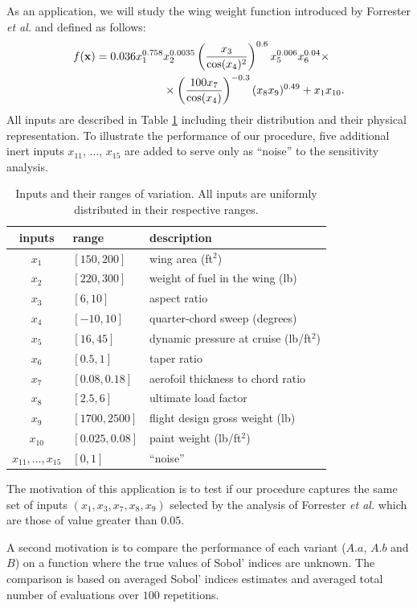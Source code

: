 As an application, we will study the wing weight function introduced by Forrester \textit{et al.} \cite{Forrester} and defined as follows:
\begin{align*}
f(\boldsymbol{\mathbf{x}})=0.036 x_1^{0.758} & x_2^{0.0035} \left(\frac{x_3}{\cos(x_4)^2}\right)^{0.6} x_5^{0.006} x_6^{0.04}\times \\
 & \times\left(\frac{100 x_7}{\cos(x_4)}\right)^{-0.3} (x_8 x_9)^{0.49} + x_1 x_{10}.
\end{align*}
All inputs are described in Table \ref{wing_inputs_table} including their distribution and their physical representation. To illustrate the performance of our procedure, five additional inert inputs $x_{11}$, $\dots$, $x_{15}$ are added to serve only as ``noise'' to the sensitivity analysis.
\begin{table}[t]
\caption{Inputs and their ranges of variation. All inputs are uniformly distributed in their respective ranges.}
\centering
\begin{tabular}{cll}
\hline
 inputs & range & description \\ \hline
$x_1$ & $[150, 200]$ & wing area (ft$^2$) \\
$x_2$ & $[220, 300]$ & weight of fuel in the wing (lb) \\
$x_3$ & $[6, 10]$ & aspect ratio \\
$x_4$ & $[-10, 10]$ & quarter-chord sweep (degrees) \\
$x_5$ & $[16, 45]$ & dynamic pressure at cruise (lb/ft$^2$) \\
$x_6$ & $[0.5, 1]$ & taper ratio \\
$x_7$ & $[0.08, 0.18]$ & aerofoil thickness to chord ratio \\
$x_8$ & $[2.5, 6]$ & ultimate load factor \\
$x_9$ & $[1700, 2500]$ & flight design gross weight (lb) \\
$x_{10}$ & $[0.025, 0.08]$ & paint weight (lb/ft$^2$) \\
$x_{11},\dots,x_{15}$ & $[0,1]$ & ``noise'' \\
\hline
\end{tabular}
\label{wing_inputs_table}
\end{table}

The motivation of this application is to test if our procedure captures the same set of  inputs $(x_1,x_3,x_7,x_8,x_9)$ selected by the analysis of Forrester \textit{et al.} which are those of value greater than $0.05$. 

A second motivation is to compare the performance of each variant ($A.a$, $A.b$ and $B$) on a function where the true values of Sobol' indices are unknown. The comparison is based on averaged Sobol' indices estimates and averaged total number of evaluations over $100$ repetitions.
\bigskip


